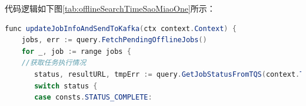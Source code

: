 \begin{longtable}[htbp]
代码逻辑如下图\ref{tab:offlineSearchTimeSaoMiaoOne}所示：


\begin{lrbox}{\offlineSearchTimeSaoMiaoOne}  
\begin{lstlisting}[language=Java]  
func updateJobInfoAndSendToKafka(ctx context.Context) {
    jobs, err := query.FetchPendingOfflineJobs()
    for _, job := range jobs {
    //获取任务执行情况
       status, resultURL, tmpErr := query.GetJobStatusFromTQS(context.TODO(), job.Namespace, job.JobId)
       switch status {
       case consts.STATUS_COMPLETE:
\end{lstlisting}  
\end{lrbox} 
\begin{table}[h]   
\caption{离线查询定时扫描状态逻辑}  
\label{tab:offlineSearchTimeSaoMiaoOne}  
\usebox{\offlineSearchTimeSaoMiaoOne}  
\end{table}  


\end{longtable}
